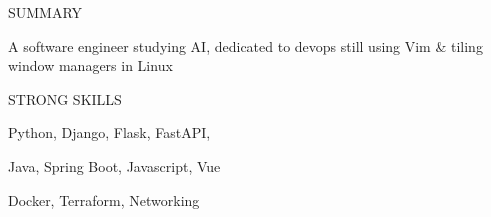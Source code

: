 \documentclass{cv} %
\def\sidespacing{0.5cm}
\begin{document}
\begin{minipage}[b][0.9\paperheight][t]{0.29\linewidth}

    \begin{minipage}[c]{\linewidth}
        \centering
    \end{minipage}

    \vspace{\sidespacing}

    \begin{rSection}{SUMMARY}
        \item A software engineer studying AI, dedicated to devops
        still using Vim \& tiling window managers in Linux
    \end{rSection}

    \vspace{\sidespacing}

    \begin{rSection}{STRONG SKILLS}
        \item Python, Django, Flask, FastAPI,
        \item Java, Spring Boot, Javascript, Vue
        \item Docker, Terraform, Networking
    \end{rSection}


\end{minipage}
\end{document}
